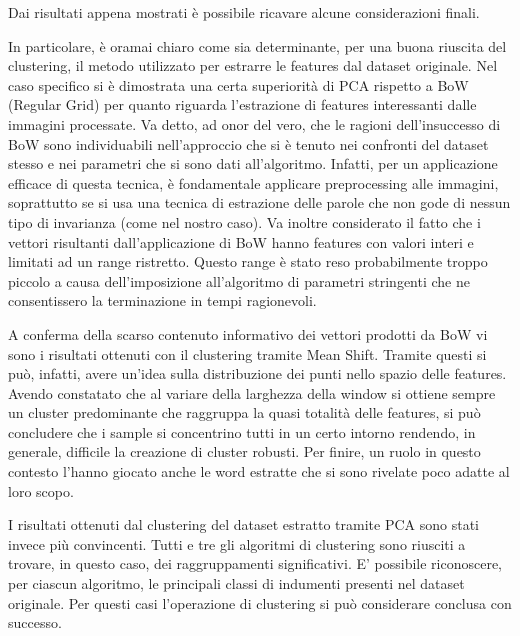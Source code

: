 \documentclass[]{report}
\begin{document}
	Dai risultati appena mostrati è possibile ricavare alcune considerazioni finali. 
	
	In particolare, è oramai chiaro come sia determinante, per una buona riuscita del clustering, il metodo utilizzato per estrarre le features dal dataset originale. Nel caso specifico si è dimostrata una certa superiorità di PCA rispetto a BoW (Regular Grid) per quanto riguarda l'estrazione di features interessanti dalle immagini processate. Va detto, ad onor del vero, che le ragioni dell'insuccesso di BoW sono individuabili nell'approccio che si è tenuto nei confronti del dataset stesso e nei parametri che si sono dati all'algoritmo. Infatti, per un applicazione efficace di questa tecnica, è fondamentale applicare preprocessing alle immagini, soprattutto se si usa una tecnica di estrazione delle parole che non gode di nessun tipo di invarianza (come nel nostro caso). Va inoltre considerato il fatto che i vettori risultanti dall'applicazione di BoW hanno features con valori interi e limitati ad un range ristretto. Questo range è stato reso probabilmente troppo piccolo a causa dell'imposizione all'algoritmo di parametri stringenti che ne consentissero la terminazione in tempi ragionevoli. 
	
	A conferma della scarso contenuto informativo dei vettori prodotti da BoW vi sono i risultati ottenuti con il clustering tramite Mean Shift. Tramite questi si può, infatti, avere un'idea sulla distribuzione dei punti nello spazio delle features. Avendo constatato che al variare della larghezza della window si ottiene sempre un cluster predominante che raggruppa la quasi totalità delle features, si può concludere che i sample si concentrino tutti in un certo intorno rendendo, in generale, difficile la creazione di cluster robusti.
	Per finire, un ruolo in questo contesto l'hanno giocato anche le word estratte che si sono rivelate poco adatte al loro scopo.
	
	I risultati ottenuti dal clustering del dataset estratto tramite PCA sono stati invece più convincenti. Tutti e tre gli algoritmi di clustering sono riusciti a trovare, in questo caso, dei raggruppamenti significativi. E' possibile riconoscere, per ciascun algoritmo, le principali classi di indumenti presenti nel dataset originale. Per questi casi l'operazione di clustering si può considerare conclusa con successo.  
\end{document}
